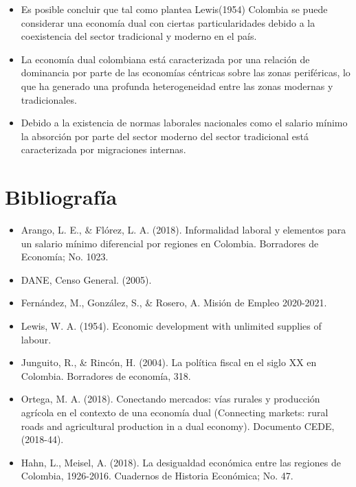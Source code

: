 \documentclass[12pt,letterpaper]{article}
\begin{document}
\begin{flushleft}
    \begin{itemize}
        \item Es posible concluir que tal como plantea Lewis(1954) Colombia se puede considerar una economía dual con ciertas particularidades
        debido a la coexistencia del sector tradicional y moderno en el país.
        \item La economía dual colombiana está caracterizada por una relación de dominancia por parte de las economías céntricas sobre las zonas periféricas, 
        lo que ha generado una profunda heterogeneidad entre las zonas modernas y tradicionales.
        \item Debido a la existencia de normas laborales nacionales como el salario mínimo la absorción por parte del sector moderno del sector tradicional está caracterizada por migraciones internas.
    \end{itemize}


\end{flushleft}

\newpage

\section{Bibliografía}

\begin{flushleft}
    \begin{itemize}
        \item Arango, L. E., \& Flórez, L. A. (2018). Informalidad laboral y elementos para un salario mínimo diferencial por regiones en Colombia. Borradores de Economía; No. 1023.
        \item DANE, Censo General. (2005).
        \item Fernández, M., González, S., \& Rosero, A. Misión de Empleo 2020-2021.
        \item Lewis, W. A. (1954). Economic development with unlimited supplies of labour.
        \item Junguito, R., \& Rincón, H. (2004). La política fiscal en el siglo XX en Colombia. Borradores de economía, 318.
        \item Ortega, M. A. (2018). Conectando mercados: vías rurales y producción agrícola en el contexto de una economía dual (Connecting markets: rural roads and agricultural production in a dual economy). Documento CEDE, (2018-44).
        \item Hahn, L., Meisel, A. (2018). La desigualdad económica entre las regiones de Colombia, 1926-2016. Cuadernos de Historia Económica; No. 47.
    \end{itemize}
\end{flushleft}
\end{document}
